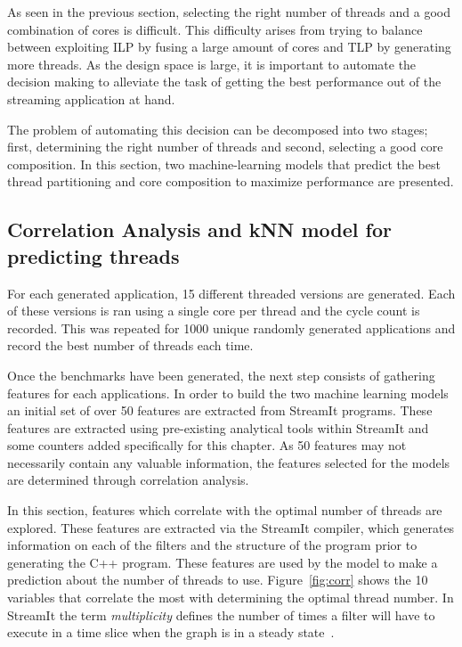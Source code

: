 As seen in the previous section, selecting the right number of threads and a good combination of cores is difficult.
This difficulty arises from trying to balance between exploiting ILP by fusing a large amount of cores and TLP by generating more threads.
As the design space is large, it is important to automate the decision making to alleviate the task of getting the best performance out of the streaming application at hand.

The problem of automating this decision can be decomposed into two stages; first, determining the right number of threads and second, selecting a good core composition.
In this section, two machine-learning models that predict the best thread partitioning and core composition to maximize performance are presented.

\subsection{Correlation Analysis and kNN model for predicting threads}

For each generated application, 15 different threaded versions are generated.
Each of these versions is ran using a single core per thread and the cycle count is recorded.
This was repeated for 1000 unique randomly generated applications and record the best number of threads each time.

Once the benchmarks have been generated, the next step consists of gathering features for each applications.
In order to build the two machine learning models an initial set of over 50 features are extracted from StreamIt programs.
These features are extracted using pre-existing analytical tools within StreamIt and some counters added specifically for this chapter.
As 50 features may not necessarily contain any valuable information, the features selected for the models are determined through correlation analysis.

In this section, features which correlate with the optimal number of threads are explored.
These features are extracted via the StreamIt compiler, which generates information on each of the filters and the structure of the program prior to generating the C++ program.
These features are used by the model to make a prediction about the number of threads to use.
Figure~\ref{fig:corr} shows the 10 variables that correlate the most with determining the optimal thread number.
In StreamIt the term \textit{multiplicity} defines the number of times a filter will have to execute in a time slice when the graph is in a steady state~\cite{gordon2002streamcomp}.

